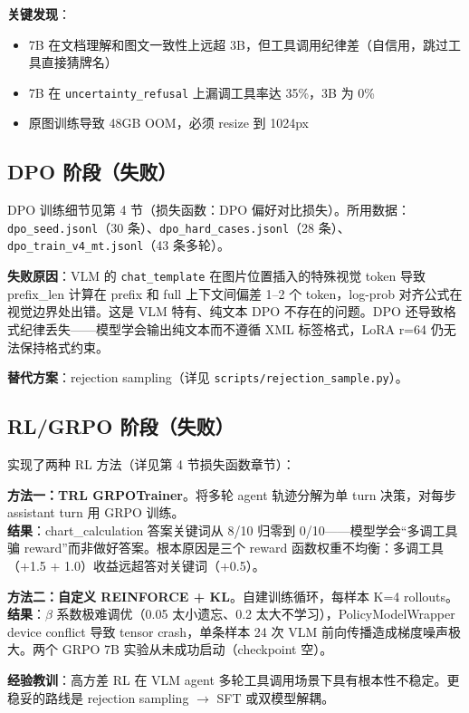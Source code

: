 \documentclass[12pt,a4paper]{ctexart}
\begin{document}
\textbf{关键发现}：
\begin{itemize}[nosep]
  \item 7B 在文档理解和图文一致性上远超 3B，但工具调用纪律差（自信用，跳过工具直接猜牌名）
  \item 7B 在 \texttt{uncertainty\_refusal} 上漏调工具率达 35\%，3B 为 0\%
  \item 原图训练导致 48GB OOM，必须 resize 到 1024px
\end{itemize}

\subsection{DPO 阶段（失败）}

DPO 训练细节见第 4 节（损失函数：DPO 偏好对比损失）。所用数据：\texttt{dpo\_seed.jsonl}（30 条）、\texttt{dpo\_hard\_cases.jsonl}（28 条）、\texttt{dpo\_train\_v4\_mt.jsonl}（43 条多轮）。

\textbf{失败原因}：VLM 的 \texttt{chat\_template} 在图片位置插入的特殊视觉 token 导致 prefix\_len 计算在 prefix 和 full 上下文间偏差 1--2 个 token，log-prob 对齐公式在视觉边界处出错。这是 VLM 特有、纯文本 DPO 不存在的问题。DPO 还导致格式纪律丢失——模型学会输出纯文本而不遵循 XML 标签格式，LoRA r=64 仍无法保持格式约束。

\textbf{替代方案}：rejection sampling（详见 \texttt{scripts/rejection\_sample.py}）。

\subsection{RL/GRPO 阶段（失败）}

实现了两种 RL 方法（详见第 4 节损失函数章节）：

\textbf{方法一：TRL GRPOTrainer}。将多轮 agent 轨迹分解为单 turn 决策，对每步 assistant turn 用 GRPO 训练。\\
\textbf{结果}：chart\_calculation 答案关键词从 8/10 归零到 0/10——模型学会``多调工具骗 reward''而非做好答案。根本原因是三个 reward 函数权重不均衡：多调工具（+1.5 + 1.0）收益远超答对关键词（+0.5）。

\textbf{方法二：自定义 REINFORCE + KL}。自建训练循环，每样本 K=4 rollouts。\\
\textbf{结果}：$\beta$ 系数极难调优（0.05 太小遗忘、0.2 太大不学习），PolicyModelWrapper device conflict 导致 tensor crash，单条样本 24 次 VLM 前向传播造成梯度噪声极大。两个 GRPO 7B 实验从未成功启动（checkpoint 空）。

\textbf{经验教训}：高方差 RL 在 VLM agent 多轮工具调用场景下具有根本性不稳定。更稳妥的路线是 rejection sampling $\rightarrow$ SFT 或双模型解耦。
\end{document}
